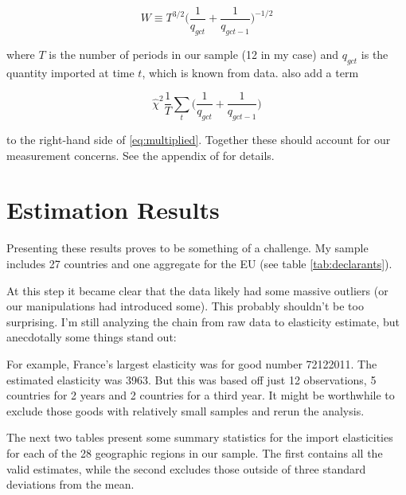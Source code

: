\documentclass[12pt,a4paper]{article}                      %
\begin{document}
\begin{equation}
    W \equiv T^{3/2}\Big(\frac{1}{q_{gct}} + \frac{1}{q_{gct - 1}})^{-1/2}
\end{equation}

where $T$ is the number of periods in our sample (12 in my case) and $q_{gct}$ is the quantity imported at time $t$, which is known from data.  \cite{broda_weinstein_2006_globalization_gains} also add a term

\begin{equation}
    \hat{\chi}^2 \frac{1}{T} \sum_t \big(\frac{1}{q_{gct}} + \frac{1}{q_{gct-1}})
\end{equation}

to the right-hand side of \ref{eq:multiplied}.  Together these should account for our measurement concerns.  See the appendix of \cite{broda_weinstein_2006_globalization_gains} for details.

\section{Estimation Results}
\label{sec:estimation_results}

Presenting these results proves to be something of a challenge.  My sample includes 27 countries and one aggregate for the EU (see table \ref{tab:declarants}).  

At this step it became clear that the data likely had some massive outliers (or our manipulations had introduced some).
This probably shouldn't be too surprising.
I'm still analyzing the chain from raw data to elasticity estimate, but anecdotally some things stand out:

For example, France's largest elasticity was for good number 72122011.  The estimated elasticity was 3963.  But this was based off just 12 observations, 5 countries for 2 years and 2 countries for a third year.
It might be worthwhile to exclude those goods with relatively small samples and rerun the analysis.

The next two tables present some summary statistics for the import elasticities for each of the 28 geographic regions in our sample.  The first contains all the valid estimates, while the second excludes those outside of three standard deviations from the mean.\\

\noindent
\label{tab:summary_stats}
\newpage

\noindent
\label{tab:inlier_summary_stats}
\end{document}
